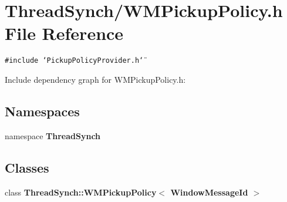 \section{Thread\-Synch/WMPickup\-Policy.h File Reference}
\label{_w_m_pickup_policy_8h}
{\tt \#include \char`\"{}Pickup\-Policy\-Provider.h\char`\"{}}\par


Include dependency graph for WMPickup\-Policy.h:\subsection*{Namespaces}
\begin{CompactItemize}
\item 
namespace {\bf Thread\-Synch}
\end{CompactItemize}
\subsection*{Classes}
\begin{CompactItemize}
\item 
class {\bf Thread\-Synch::WMPickup\-Policy$<$ Window\-Message\-Id $>$}
\end{CompactItemize}
